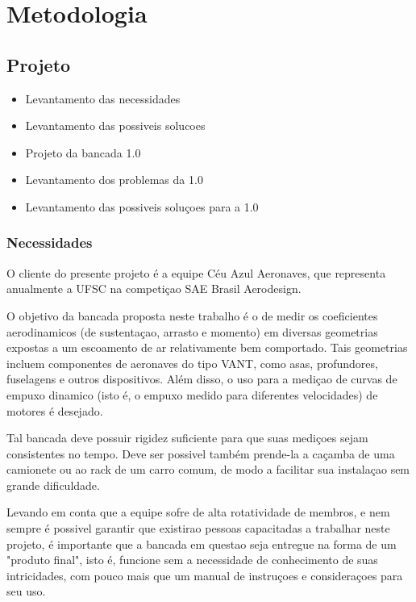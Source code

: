 \chapter{Metodologia}\label{chp:met}

\section{Projeto}

\begin{itemize}
    \item Levantamento das necessidades
    \item Levantamento das possiveis solucoes
    \item Projeto da bancada 1.0
    \item Levantamento dos problemas da 1.0
    \item Levantamento das possiveis soluçoes para a 1.0
\end{itemize}

\subsection{Necessidades}

O cliente do presente projeto é a equipe Céu Azul Aeronaves, que representa anualmente a UFSC na competiçao SAE Brasil Aerodesign.

O objetivo da bancada proposta neste trabalho é o de medir os coeficientes aerodinamicos (de sustentaçao, arrasto e momento) em diversas geometrias expostas a um escoamento de ar relativamente bem comportado. Tais geometrias incluem componentes de aeronaves do tipo VANT, como asas, profundores, fuselagens e outros dispositivos. Além disso, o uso para a mediçao de curvas de empuxo dinamico (isto é, o empuxo medido para diferentes velocidades) de motores é desejado.

Tal bancada deve possuir rigidez suficiente para que suas mediçoes sejam consistentes no tempo. Deve ser possivel também prende-la a caçamba de uma camionete ou ao rack de um carro comum, de modo a facilitar sua instalaçao sem grande dificuldade.

Levando em conta que a equipe sofre de alta rotatividade de membros, e nem sempre é possivel garantir que existirao pessoas capacitadas a trabalhar neste projeto, é importante que a bancada em questao seja entregue na forma de um "produto final", isto é, funcione sem a necessidade de conhecimento de suas intricidades, com pouco mais que um manual de instruçoes e consideraçoes para seu uso.

